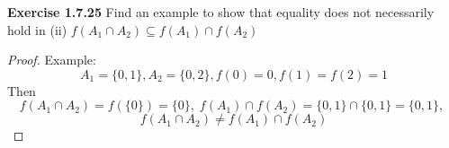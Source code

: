 \documentclass[12pt]{article}
\theoremstyle{definition}
\newtheorem{definition}[theorem]{Definition}
\numberwithin{equation}{subsection}
\begin{document}
\textbf{Exercise 1.7.25} Find an example to show that equality does not necessarily hold in (ii) \(f\left(A_{1} \cap A_{2}\right) \subseteq f\left(A_{1}\right) \cap f\left(A_{2}\right)\)
\begin{proof}
Example:\\
$$
A_1=\{0,1\}, A_2=\{0,2\}, f(0)=0, f(1)=f(2)=1
$$
Then
$$
f\left(A_{1} \cap A_{2}\right)=f(\{0\})=\{0\},\;
f\left(A_{1}\right) \cap f\left(A_{2}\right)=\{0,1\}\cap\{0,1\}=\{0,1\}, \;
$$
$$f\left(A_{1} \cap A_{2}\right) \neq f\left(A_{1}\right) \cap f\left(A_{2}\right)$$
\end{proof}









\end{document}
